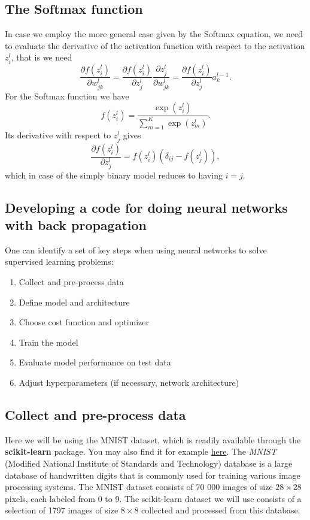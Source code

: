 \documentclass[%
oneside,                 %
final,                   %
10pt]{article}
\begin{document}
\subsection{The Softmax function}
In case we employ the more general case given by the Softmax equation, we need to evaluate the derivative of the activation function with respect to the activation $z_i^l$, that is we need
\[
\frac{\partial f(z_i^l)}{\partial w_{jk}^l} =
\frac{\partial f(z_i^l)}{\partial z_j^l} \frac{\partial z_j^l}{\partial w_{jk}^l}= \frac{\partial f(z_i^l)}{\partial z_j^l}a_k^{l-1}.
\]
For the Softmax function we have
\[
f(z_i^l) = \frac{\exp{(z_i^l)}}{\sum_{m=1}^K\exp{(z_m^l)}}.
\]
Its derivative with respect to $z_j^l$ gives 
\[
\frac{\partial f(z_i^l)}{\partial z_j^l}= f(z_i^l)\left(\delta_{ij}-f(z_j^l)\right), 
\]
which in case of the simply binary model reduces to  having $i=j$. 

\subsection{Developing a code for doing neural networks with back propagation}

One can identify a set of key steps when using neural networks to solve supervised learning problems:  

\begin{enumerate}
\item Collect and pre-process data  

\item Define model and architecture  

\item Choose cost function and optimizer  

\item Train the model  

\item Evaluate model performance on test data  

\item Adjust hyperparameters (if necessary, network architecture)
\end{enumerate}

\noindent
\subsection{Collect and pre-process data}

Here we will be using the MNIST dataset, which is readily available through the \textbf{scikit-learn}
package. You may also find it for example \href{{http://yann.lecun.com/exdb/mnist/}}{here}.  
The \emph{MNIST} (Modified National Institute of Standards and Technology) database is a large database
of handwritten digits that is commonly used for training various image processing systems.  
The MNIST dataset consists of 70 000 images of size $28\times 28$ pixels, each labeled from 0 to 9.  
The scikit-learn dataset we will use consists of a selection of 1797 images of size $8\times 8$ collected and processed from this database.  
\end{document}
